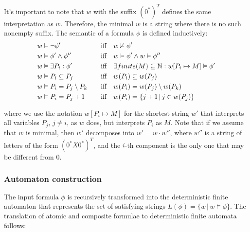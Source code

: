\documentclass[pdflatex,sn-mathphys-num]{sn-jnl}%
\theoremstyle{thmstyleone}%
\theoremstyle{thmstyletwo}%
\theoremstyle{thmstylethree}%
\begin{document}
            \noindent It's important to note that $w$ with the suffix $(0^*)^T$ defines the same interpretation as $w$. Therefore, the minimal $w$ is a string where there is no such nonempty suffix. The semantic of a formula $\phi$ is defined inductively:
                \begin{alignat*}{2}
                    &w \vDash \neg \phi' \quad && \textnormal{iff}\quad  w \nvDash \phi'\\
                    &w \vDash \phi' \land \phi'' \quad &&\textnormal{iff}\quad  w \vDash \phi' \land w \vDash \phi''\\
                    &w \vDash \exists P_i : \phi' \quad &&\textnormal{iff}\quad  \exists finite(M) \subseteq \mathbb{N} : w[P_i \mapsto M] \vDash \phi'\\
                    &w \vDash P_i \subseteq P_j \quad &&\textnormal{iff}\quad  w(P_i) \subseteq w(P_j)\\
                    &w \vDash P_i = P_j \setminus P_k \quad &&\textnormal{iff}\quad  w(P_i) = w(P_j) \setminus w(P_k)\\
                    &w \vDash P_i = P_j + 1 \quad &&\textnormal{iff}\quad  w(P_i) = \{j + 1\,|\, j \in w(P_j)\}
                \end{alignat*}

                \noindent where we use the notation $w[P_i \mapsto M]$ for the shortest string $w'$ that interprets all variables $P_j$, $j \neq i$, as $w$ does, but interprets $P_i$ as $M$. Note that if we assume that $w$ is minimal, then $w'$ decomposes into $w' = w \cdot w''$, where $w''$ is a string of letters of the form $(0^*X0^*)^T$, and the $i$-th component is the only one that may be different from 0.

        \subsubsection*{Automaton construction}
            The input formula $\phi$ is recursively transformed into the deterministic finite automaton that represents the set of satisfying strings $L(\phi) = \{w\,|\, w \vDash \phi\}$. The translation of atomic and composite formulae to deterministic finite automata follows:


            \vspace*{0.5em}
\end{document}
